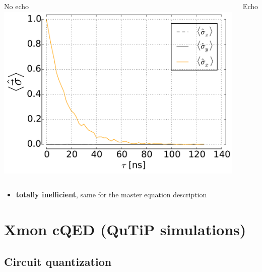 \documentclass[aspectratio=169, 13pt, t]{beamer}
\begin{document}
\begin{frame}[t]
{\begin{columns}[c]
	No echo
	\centering
	\includegraphics[width=\textwidth]{deph_white_se}
	
	Echo
	\end{columns}
	
	\vspace{0.2cm}
	\begin{itemize}
		\centering	
	\item \textbf{totally inefficient}, same for the master equation description
	\end{itemize}
	
}
\end{frame}

\section{Xmon cQED (QuTiP simulations)}


\subsection{Circuit quantization}
\end{document}
